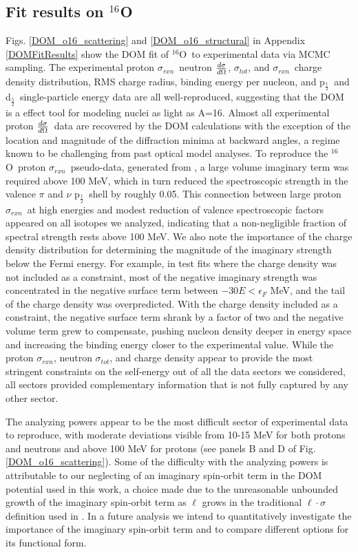 \documentclass[twocolumn,secnumarabic,amssymb, nobibnotes, aps, prl,
superscriptaddress, nobalancelastpage]{revtex4}
\newcommand{\tot}{\ensuremath{\sigma_{tot}}}
\newcommand{\rxn}{\ensuremath{\sigma_{rxn}}}
\newcommand{\el}{\ensuremath{\frac{\lowercase{d}\sigma}{\lowercase{d}\Omega}}}
\newcommand{\oSix}{\ensuremath{^{16}}O}
\newcommand{\pOne}{p\ensuremath{_{\frac{1}{2}}}}
\newcommand{\dFive}{d\ensuremath{_{\frac{5}{2}}}}
\begin{document}
\subsection{Fit results on $^{16}$O}
Figs. \ref{DOM_o16_scattering} and \ref{DOM_o16_structural} in Appendix
\ref{DOMFitResults} show the DOM fit of \oSix\ to experimental data via
MCMC sampling. The experimental proton \rxn\, neutron \el, \tot, 
and \rxn\, charge density distribution, RMS charge radius, binding energy per nucleon,
and \pOne\ and \dFive\ single-particle energy data are all well-reproduced,
suggesting that the DOM is a effect tool for modeling nuclei as light as A=16.
Almost all experimental proton \el\ data are recovered by the DOM
calculations with the exception of the location and magnitude of the diffraction
minima at backward angles, a regime known to be challenging from past
optical model analyses. To reproduce the \oSix\ proton \rxn\
pseudo-data, generated from \cite{Carlson1975}, a large volume imaginary term
was required above 100 MeV, which in turn reduced the spectroscopic strength in
the valence $\pi$ and $\nu$ \pOne\ shell by roughly 0.05. This connection
between large proton \rxn\ at high energies and modest reduction of valence
spectroscopic factors appeared on all isotopes we analyzed, indicating that a
non-negligible fraction of spectral strength rests above 100 MeV. We also note
the importance of the charge density distribution for determining the 
magnitude of the imaginary strength below the Fermi energy. For example, in test
fits where the charge density was not included as a constraint, most of the
negative imaginary strength was concentrated in the negative surface term
between $-30 E < \epsilon_{F}$ MeV, and the tail of the charge density was
overpredicted. With the charge density included as a constraint,
the negative surface term shrank by a factor of two and the negative volume term
grew to compensate, pushing nucleon density deeper in energy space and
increasing the binding energy closer to the experimental value. While
the proton \rxn, neutron \tot, and charge density appear to provide the most
stringent constraints on the self-energy out of all the data sectors we
considered, all sectors provided complementary information that is not fully
captured by any other sector.

The analyzing powers appear to be the most difficult sector of experimental data to
reproduce, with moderate deviations visible from 10-15 MeV for both protons and
neutrons and above 100 MeV for protons (see panels B and D of
Fig. \ref{DOM_o16_scattering}). Some
of the difficulty with the analyzing powers is attributable to our neglecting of
an imaginary spin-orbit term in the DOM potential used in this work, a choice
made due to the unreasonable unbounded growth of the imaginary spin-orbit term
as $\ell$ grows in the traditional $\ell\cdot\sigma$ definition used in
\cite{KoningDelaroche}. In a future analysis we intend to quantitatively
investigate the importance of the imaginary spin-orbit term and to compare
different options for its functional form.
\end{document}
